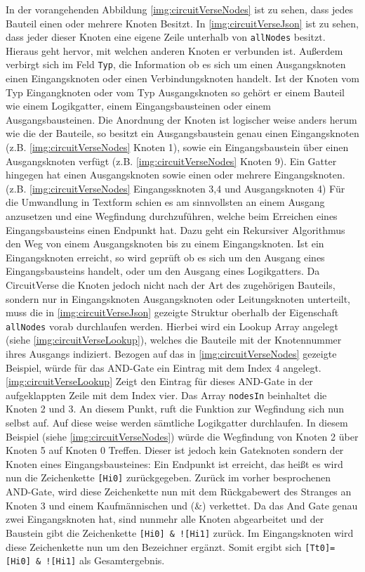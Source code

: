  
 In der vorangehenden Abbildung \ref{img:circuitVerseNodes} ist zu sehen, dass jedes Bauteil einen oder mehrere Knoten Besitzt. In \autoref{img:circuitVerseJson} ist zu sehen, dass jeder dieser Knoten eine eigene Zeile unterhalb von \texttt{allNodes} besitzt. Hieraus geht hervor, mit welchen anderen Knoten er verbunden ist. Außerdem verbirgt sich im Feld \texttt{Typ}, die Information ob es sich um einen Ausgangsknoten einen Eingangsknoten oder einen Verbindungsknoten handelt. Ist der Knoten vom Typ Eingangknoten oder vom Typ Ausgangsknoten so gehört er einem Bauteil wie einem Logikgatter, einem Eingangsbausteinen oder einem Ausgangsbausteinen. Die Anordnung der Knoten ist logischer weise anders herum wie die der Bauteile, so besitzt ein Ausgangsbaustein genau einen Eingangsknoten (z.B.  \ref{img:circuitVerseNodes} Knoten 1), sowie ein Eingangsbaustein über einen Ausgangsknoten verfügt (z.B. \autoref{img:circuitVerseNodes} Knoten 9). Ein Gatter hingegen hat einen Ausgangsknoten sowie einen oder mehrere Eingangsknoten. (z.B. \autoref{img:circuitVerseNodes} Eingangssknoten 3,4 und Ausgangsknoten 4) Für die Umwandlung in Textform schien es am sinnvollsten an einem Ausgang anzusetzen und eine Wegfindung durchzuführen, welche beim Erreichen eines Eingangsbausteins einen Endpunkt hat. Dazu geht ein Rekursiver Algorithmus den Weg von einem Ausgangsknoten bis zu einem Eingangsknoten. Ist ein Eingangsknoten erreicht, so wird geprüft ob es sich um den Ausgang eines Eingangsbausteins handelt, oder um den Ausgang eines Logikgatters. Da CircuitVerse die Knoten jedoch nicht nach der Art des zugehörigen Bauteils, sondern nur in Eingangsknoten Ausgangsknoten oder Leitungsknoten unterteilt, muss die in \ref{img:circuitVerseJson} gezeigte Struktur oberhalb der Eigenschaft \texttt{allNodes} vorab durchlaufen werden. Hierbei wird ein Lookup Array angelegt (siehe \autoref{img:circuitVerseLookup}), welches die Bauteile mit der Knotennummer ihres Ausgangs indiziert. Bezogen auf das in \autoref{img:circuitVerseNodes} gezeigte Beispiel, würde für das AND-Gate ein Eintrag mit dem Index 4 angelegt. \autoref{img:circuitVerseLookup} Zeigt den Eintrag für dieses AND-Gate in der aufgeklappten Zeile mit dem Index vier. Das Array \texttt{nodesIn} beinhaltet die Knoten 2 und 3. An diesem Punkt, ruft die Funktion zur Wegfindung sich nun selbst auf. Auf diese weise werden sämtliche Logikgatter durchlaufen. In diesem Beispiel (siehe \autoref{img:circuitVerseNodes}) würde die Wegfindung von Knoten 2 über Knoten 5 auf Knoten 0 Treffen. Dieser ist jedoch kein Gateknoten sondern der Knoten eines Eingangsbausteines: Ein Endpunkt ist erreicht, das heißt es wird nun die Zeichenkette \texttt{[Hi0]} zurückgegeben. Zurück im vorher besprochenen AND-Gate, wird diese Zeichenkette nun mit dem Rückgabewert des Stranges an Knoten 3 und einem Kaufmännischen und (\&) verkettet. Da das And Gate genau zwei Eingangsknoten hat, sind nunmehr alle Knoten abgearbeitet und der Baustein gibt die Zeichenkette \texttt{[Hi0] \& ![Hi1]} zurück. Im Eingangsknoten wird diese Zeichenkette nun um den Bezeichner ergänzt.  Somit ergibt sich \texttt{[Tt0]=[Hi0] \& ![Hi1]} als Gesamtergebnis. 
